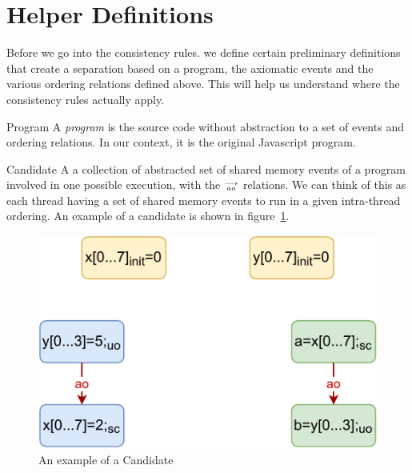 \section{Helper Definitions}
    
    Before we go into the consistency rules. we define certain preliminary definitions that create a separation based on a program, the axiomatic events and the various ordering relations defined above. This will help us understand where the consistency rules actually apply.    
    
    \begin{definition}{Program} 
        A \emph{program} is the source code without abstraction to a set of events and ordering relations. In our context, it is the original Javascript program. 
        
    \end{definition}
    
    \begin{definition}{Candidate}
        A a collection of abstracted set of shared memory events of a program involved in one possible execution, with the $\stackrel{\longrightarrow}{_\textit{ao}}$ relations. We can think of this as each thread having a set of shared memory events to run in a given intra-thread ordering. An example of a candidate is shown in figure~\ref{fig:candidate}.
        
        \begin{figure}[H]
            \centering
            \includegraphics[scale=0.7]{4.ECMAScriptMemoryModel/candidate.pdf}
            \caption{An example of a Candidate}
            \label{fig:candidate}
        \end{figure}
        
    \end{definition}

